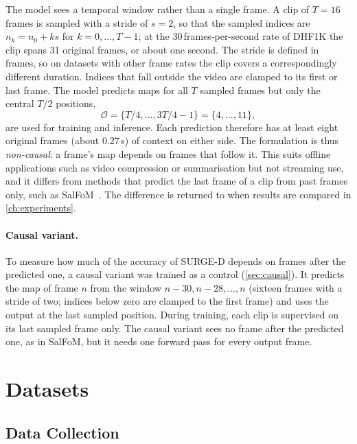The model sees a temporal window rather than a single frame. A clip of
$T=16$ frames is sampled with a stride of $s=2$, so that the sampled indices
are $n_k=n_0+ks$ for $k=0,\dots,T-1$; at the 30\,frames-per-second rate of
DHF1K the clip spans 31 original frames, or about one second. The stride is
defined in frames, so on datasets with other frame rates the clip covers a
correspondingly different duration. Indices that fall outside the video are
clamped to its first or last frame. The model
predicts maps for all $T$ sampled frames but only the central $T/2$
positions,
\begin{equation}
  \mathcal{O}=\{T/4,\dots,3T/4-1\}=\{4,\dots,11\},
  \label{eq:central}
\end{equation}
are used for training and inference. Each prediction therefore has at
least eight original frames (about 0.27\,s) of context on either side. The
formulation is thus \emph{non-causal}: a frame's map depends on frames that
follow it. This suits offline applications such as video compression or
summarisation but not streaming use, and it differs from methods that predict
the last frame of a clip from past frames only, such as
SalFoM~\cite{moradi2024salfom}. The difference is returned to when results
are compared in \cref{ch:experiments}.

\paragraph{Causal variant.} To measure how much of the accuracy of SURGE-D
depends on frames after the predicted one, a causal variant was trained as a
control (\cref{sec:causal}). It predicts the map of frame $n$ from the window
$n-30, n-28, \dots, n$ (sixteen frames with a stride of two; indices below zero
are clamped to the first frame) and uses the output at the last sampled
position. During training, each clip is supervised on its last sampled frame
only. The causal variant sees no frame after the predicted one, as in SalFoM,
but it needs one forward pass for every output frame.

\section{Datasets}\label{sec:dataset}

\subsection{Data Collection}

